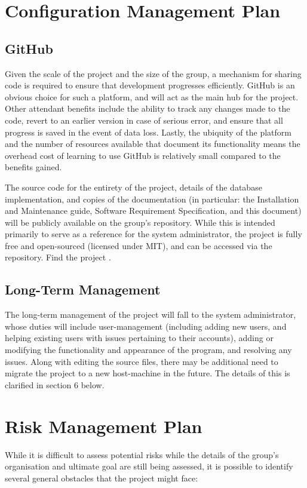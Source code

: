 \documentclass[11pt]{article}
\newcommand{\MYhref}[3][blue]{\href{#2}{\color{#1}{#3}}}%
\begin{document}
\section{Configuration Management Plan}
\subsection{GitHub}
Given the scale of the project and the size of the group, a mechanism for sharing code is required
to ensure that development progresses efficiently. GitHub is an obvious choice for such a platform,
and will act as the main hub for the project. Other attendant benefits include the ability to track
any changes made to the code, revert to an earlier version in case of serious error, and ensure that
all progress is saved in the event of data loss. Lastly, the ubiquity of the platform and the number
of resources available that document its functionality means the overhead cost of learning to use
GitHub is relatively small compared to the benefits gained.

The source code for the entirety of the project, details of the database implementation, and copies
of the documentation (in particular: the Installation and Maintenance guide, Software Requirement
Specification, and this document) will be publicly available on the group's repository. While this
is intended primarily to serve as a reference for the system administrator, the project is fully free
and open-sourced (licensed under MIT), and can be accessed via the repository. Find the
project \MYhref{https://github.com/CSCI34284/group4_project}{here}.

\subsection{Long-Term Management}
The long-term management of the project will fall to the system administrator, whose duties will
include user-management (including adding new users, and helping existing users with issues pertaining
to their accounts), adding or modifying the functionality and appearance of the program, and
resolving any issues. Along with editing the source files, there may be additional need to migrate
the project to a new host-machine in the future. The details of this is clarified in section 6
below.

\section{Risk Management Plan}
While it is difficult to assess potential risks while the details of the group's organisation and
ultimate goal are still being assessed, it is possible to identify several general obstacles that
the project might face:
\end{document}
